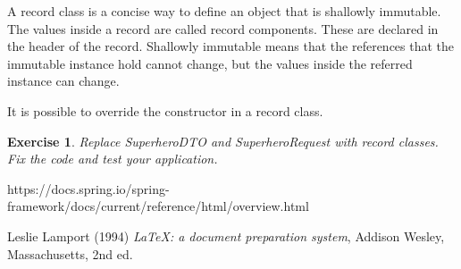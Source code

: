 \documentclass[a4paper, 12pt]{report}
\newenvironment{boxexercise}
{\begin{tcolorbox}
[enhanced jigsaw,breakable,pad at break*=1mm,
 colback=tsyellow!20,boxrule=0pt,frame hidden]}
{\end{tcolorbox}}
\newtheorem{envoefening}{\textbf{Exercise}}[chapter]
\newenvironment{oefening}
               {\begin{boxexercise}\begin{envoefening}}
               {\end{envoefening}\end{boxexercise}}
\begin{document}
A record class is a concise way to define an object that is shallowly immutable. The values inside a record are called record components. These are declared in the header of the record. Shallowly immutable means that the references that the immutable instance hold cannot change, but the values inside the referred instance can change.

It is possible to override the constructor in a record class.

\begin{oefening}
Replace SuperheroDTO and SuperheroRequest with record classes. Fix the code and test your application.
\end{oefening}


  















\begin{thebibliography}{9}
https://docs.spring.io/spring-framework/docs/current/reference/html/overview.html

Leslie Lamport (1994) \emph{\LaTeX: a document preparation system}, Addison
Wesley, Massachusetts, 2nd ed.


\end{thebibliography}
\end{document}
